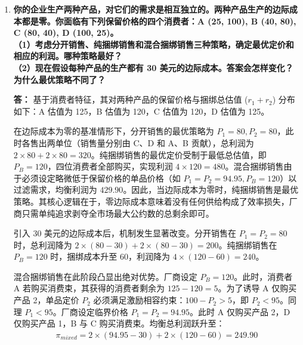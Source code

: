 \begin{enumerate}[label=\textbf{\arabic*.}, leftmargin=*]
\begin{center}
		\end{center}
		
		
		\item \textbf{你的企业生产两种产品，对它们的需求是相互独立的。两种产品生产的边际成本都是零。你面临有下列保留价格的四个消费者：A (25, 100), B (40, 80), C (80, 40), D (100, 25)。\\
			（1）考虑分开销售、纯捆绑销售和混合捆绑销售三种策略，确定最优定价和相应的利润。哪种策略最好？\\
			（2）现在假设每种产品的生产都有 30 美元的边际成本。答案会怎样变化？为什么最优策略不同了？}
		
		\textbf{答：}
		基于消费者特征，其对两种产品的保留价格与捆绑总估值 ($r_1+r_2$) 分布如下：A 估值为 125，B 估值为 120，C 估值为 120，D 估值为 125。
		
		在边际成本为零的基准情形下，分开销售的最优策略为 $P_1 = 80, P_2 = 80$，此时各售出两单位（销售量分别由 C、D 和 A、B 贡献），总利润为 $2 \times 80 + 2 \times 80 = 320$。纯捆绑销售的最优定价受制于最低总估值，即 $P_B = 120$，四位消费者全部购买，实现利润 $4 \times 120 = 480$。混合捆绑销售由于必须设定略微低于保留价格的单品价格（如 $P_1 = P_2 = 94.95, P_B = 120$）以过滤需求，均衡利润为 $429.90$。因此，当边际成本为零时，纯捆绑销售是最优策略。其核心逻辑在于，零边际成本意味着没有任何供给构成了效率损失，厂商只需单纯追求剥夺全市场最大公约数的总剩余即可。
		
		引入 30 美元的边际成本后，机制发生显著改变。分开销售在 $P_1 = P_2 = 80$ 时，总利润降为 $2 \times (80-30) + 2 \times (80-30) = 200$。纯捆绑销售在 $P_B = 120$ 时，捆绑成本升至 60，利润降为 $4 \times (120-60) = 240$。
		
		混合捆绑销售在此阶段凸显出绝对优势。厂商设定 $P_B = 120$。此时，消费者 A 若购买消费束，其获得的消费者剩余为 $125 - 120 = 5$。为了诱导 A 仅购买产品 2，单品定价 $P_2$ 必须满足激励相容约束：$100 - P_2 > 5$，即 $P_2 < 95$。同理 $P_1 < 95$。厂商设定临界价格 $P_1 = P_2 = 94.95$。此时 A 仅购买产品 2，D 仅购买产品 1，B 与 C 购买消费束。均衡总利润跃升至：
		\[
		\begin{aligned}
			\pi_{mixed} = 2 \times (94.95 - 30) + 2 \times (120 - 60) = 249.90
		\end{aligned}
		\]
		

\end{enumerate}
